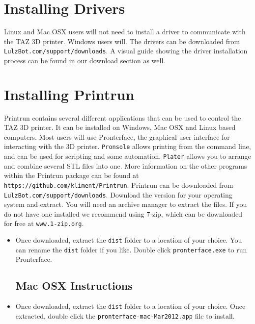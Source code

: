 \begin{enumerate}
\section{Installing Drivers}
Linux and Mac OSX users will not need to install a driver to communicate with the TAZ 3D printer. Windows users will. The drivers can be downloaded from \texttt{LulzBot.com/support/downloads}. A visual guide showing the driver installation process can be found in our download section as well.

\section{Installing Printrun}
Printrun contains several different applications that can be used to control the TAZ 3D printer. It can be installed on Windows, Mac OSX and Linux based computers. Most users will use Pronterface, the graphical user interface for interacting with the 3D printer. \texttt{Pronsole} allows printing from the command line, and can be used for scripting and some automation. \texttt{Plater} allows you to arrange and combine several STL files into one. More information on the other programs within the Printrun package can be found at \texttt{https://github.com/kliment/Printrun}. Printrun can be downloaded from \texttt{LulzBot.com/support/downloads}. Download the version for your operating system and extract. You will need an archive manager to extract the files. If you do not have one installed we recommend using 7-zip, which can be downloaded for free at \texttt{www.1-zip.org}.

\begin{itemize}
\subsection{Windows Instructions}
\item Once downloaded, extract the \texttt{dist} folder to a location of your choice. You can rename the \texttt{dist} folder if you like. Double click \texttt{pronterface.exe} to run Pronterface.


\subsection{Mac OSX Instructions}
\item Once downloaded, extract the \texttt{dist} folder to a location of your choice. Once extracted, double click the \texttt{pronterface-mac-Mar2012.app} file to install.


\end{itemize}
\end{enumerate}
